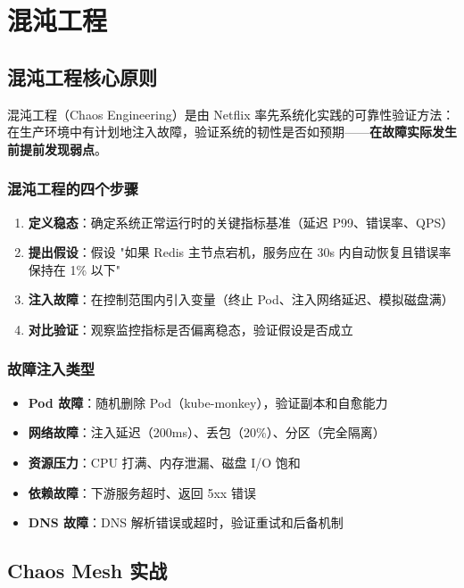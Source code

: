 \documentclass[12pt,UTF8]{ctexbook}
\begin{document}
\chapter{混沌工程}
\label{chap:chaos-engineering}

\section{混沌工程核心原则}
\label{sec:chaos-principles}

混沌工程（Chaos Engineering）是由 Netflix 率先系统化实践的可靠性验证方法：在生产环境中有计划地注入故障，验证系统的韧性是否如预期——\textbf{在故障实际发生前提前发现弱点}。

\subsection{混沌工程的四个步骤}

\begin{enumerate}
    \item \textbf{定义稳态}：确定系统正常运行时的关键指标基准（延迟 P99、错误率、QPS）
    \item \textbf{提出假设}：假设 "如果 Redis 主节点宕机，服务应在 30s 内自动恢复且错误率保持在 1\% 以下"
    \item \textbf{注入故障}：在控制范围内引入变量（终止 Pod、注入网络延迟、模拟磁盘满）
    \item \textbf{对比验证}：观察监控指标是否偏离稳态，验证假设是否成立
\end{enumerate}

\subsection{故障注入类型}

\begin{itemize}
    \item \textbf{Pod 故障}：随机删除 Pod（kube-monkey），验证副本和自愈能力
    \item \textbf{网络故障}：注入延迟（200ms）、丢包（20\%）、分区（完全隔离）
    \item \textbf{资源压力}：CPU 打满、内存泄漏、磁盘 I/O 饱和
    \item \textbf{依赖故障}：下游服务超时、返回 5xx 错误
    \item \textbf{DNS 故障}：DNS 解析错误或超时，验证重试和后备机制
\end{itemize}

\section{Chaos Mesh 实战}
\label{sec:chaos-mesh}
\end{document}
